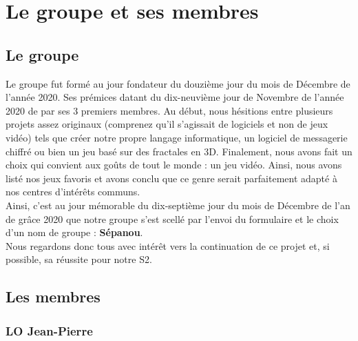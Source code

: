 \documentclass{article}
\begin{document}
\pagebreak

\section{Le groupe et ses membres}

\subsection{Le groupe}

Le groupe fut formé au jour fondateur du douzième jour du mois de Décembre de l'année 2020. Ses prémices datant du dix-neuvième jour de Novembre de l'année 2020 de par ses 3 premiers membres. Au début, nous hésitions entre plusieurs projets assez originaux (comprenez qu'il s'agissait de logiciels et non de jeux vidéo) tels que créer notre propre langage informatique, un logiciel de messagerie chiffré ou bien un jeu basé sur des fractales en 3D. Finalement, nous avons fait un choix qui convient aux goûts de tout le monde : un jeu vidéo. Ainsi, nous avons listé nos jeux favoris et avons conclu que ce genre serait parfaitement adapté à nos centres d'intérêts communs.\\
Ainsi, c'est au jour mémorable du dix-septième jour du mois de Décembre de l'an de grâce 2020 que notre groupe s'est scellé par l'envoi du formulaire et le choix d'un nom de groupe : \textbf{Sépanou}.\\
Nous regardons donc tous avec intérêt vers la continuation de ce projet et, si possible, sa réussite pour notre S2.

\subsection{Les membres}

\subsubsection{LO Jean-Pierre}
\end{document}
